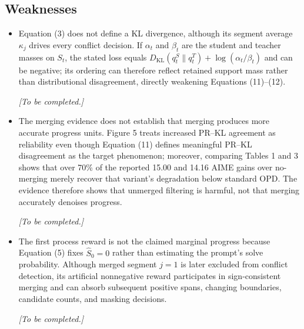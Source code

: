 \documentclass[11pt,a4paper]{article}
\begin{document}
\subsection*{Weaknesses}
\begin{itemize}
\item Equation (3) does not define a KL divergence, although its segment average $\kappa_j$ drives every conflict decision. If $\alpha_t$ and $\beta_t$ are the student and teacher masses on $S_t$, the stated loss equals $D_{\mathrm{KL}}(q_t^S\parallel q_t^T) + \log(\alpha_t/\beta_t)$ and can be negative; its ordering can therefore reflect retained support mass rather than distributional disagreement, directly weakening Equations (11)--(12).
\par{}
\begin{responsebox}[frametitle={Response to W1},nobreak=true]
\textit{[To be completed.]}\par\vspace{1em}
\end{responsebox}

\item The merging evidence does not establish that merging produces more accurate progress units. Figure 5 treats increased PR--KL agreement as reliability even though Equation (11) defines meaningful PR--KL disagreement as the target phenomenon; moreover, comparing Tables 1 and 3 shows that over 70\% of the reported 15.00 and 14.16 AIME gains over no-merging merely recover that variant's degradation below standard OPD. The evidence therefore shows that unmerged filtering is harmful, not that merging accurately denoises progress.
\par{}
\begin{responsebox}[frametitle={Response to W2},nobreak=true]
\textit{[To be completed.]}\par\vspace{1em}
\end{responsebox}

\item The first process reward is not the claimed marginal progress because Equation (5) fixes $\hat{S}_0 = 0$ rather than estimating the prompt's solve probability. Although merged segment $j = 1$ is later excluded from conflict detection, its artificial nonnegative reward participates in sign-consistent merging and can absorb subsequent positive spans, changing boundaries, candidate counts, and masking decisions.
\par{}
\begin{responsebox}[frametitle={Response to W3},nobreak=true]
\textit{[To be completed.]}\par\vspace{1em}
\end{responsebox}


\end{itemize}
\end{document}
